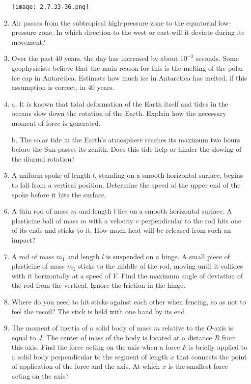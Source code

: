 \documentclass{article}
\begin{document}
\begin{enumerate}[label=2.7.\arabic*]
\begin{center}
    \texttt{[image: 2.7.33-36.png]}
\end{center}

\item Air passes from the subtropical high-pressure zone to the equatorial low-pressure zone. In which direction-to the west or east-will it deviate during its movement?

\item Over the past $40$ years, the day has increased by about $10^{-3}$ seconds. Some geophysicists believe that the main reason for this is the melting of the polar ice cap in Antarctica. Estimate how much ice in Antarctica has melted, if this assumption is correct, in $40$ years. 

\item a. It is known that tidal deformation of the Earth itself and tides in the oceans slow down the rotation of the Earth. Explain how the necessary moment of force is generated.

b. The solar tide in the Earth's atmosphere reaches its maximum two hours before the Sun passes its zenith. Does this tide help or hinder the slowing of the diurnal rotation?

\item A uniform spoke of length $l$, standing on a smooth horizontal surface, begins to fall from a vertical position. Determine the speed of the upper end of the spoke before it hits the surface.

\item A thin rod of mass $m$ and length $l$ lies on a smooth horizontal surface. A plasticine ball of mass $m$ with a velocity $v$ perpendicular to the rod hits one of its ends and sticks to it. How much heat will be released from such an impact?

\item A rod of mass $m_1$ and length $l$ is suspended on a hinge. A small piece of plasticine of mass $m_2$ sticks to the middle of the rod, moving until it collides with it horizontally at a speed of $V$. Find the maximum angle of deviation of the rod from the vertical. Ignore the friction in the hinge.

\item Where do you need to hit sticks against each other when fencing, so as not to feel the recoil? The stick is held with one hand by its end.

\item The moment of inertia of a solid body of mass $m$ relative to the $O$-axis is equal to $J$. The center of mass of the body is located at a distance $R$ from this axis. Find the force acting on the axis when a force $F$ is briefly applied to a solid body perpendicular to the segment of length $x$ that connects the point of application of the force and the axis. At which $x$ is the smallest force acting on the axis?


\end{enumerate}
\end{document}
